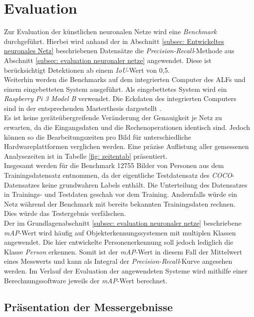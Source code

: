 \chapter{Evaluation}
\label{ch: Verifikation}
Zur Evaluation der künstlichen neuronalen Netze wird eine \textit{Benchmark} durchgeführt. Hierbei wird anhand der in Abschnitt \ref{subsec: Entwickeltes neuronales Netz} beschriebenen Datensätze die \textit{Precision-Recall}-Methode aus Abschnitt \ref{subsec: evaluation neuronaler netze} angewendet. Diese ist berücksichtigt Detektionen ab einem \textit{IoU}-Wert von 0,5.\\

 Weiterhin werden die Benchmarks auf dem integrierten Computer des ALFs und einem eingebetteten System ausgeführt. Als eingebettetes System wird ein \textit{Raspberry Pi 3 Model B} verwendet. Die Eckdaten des integrierten Computers sind in der entsprechenden Masterthesis dargestellt \cite{alf}.\\

Es ist keine geräteübergreifende Veränderung der Genauigkeit je Netz zu erwarten, da die Eingangsdaten und die Rechenoperationen identisch sind. Jedoch können so die Bearbeitungszeiten pro Bild für unterschiedliche Hardwareplattformen verglichen werden. Eine präzise Auflistung aller gemessenen Analysezeiten ist in Tabelle \ref{fig: zeitentab} präsentiert. \\

Insgesamt werden für die Benchmark 12755 Bilder von Personen aus dem Trainingsdatensatz entnommen, da der eigentliche Testdatensatz des \textit{COCO}-Datensatzes keine grundwahren Labels enthält. Die Unterteilung des Datensatzes in Trainings- und Testdaten geschah vor dem Training. Andernfalls würde ein Netz während der Benchmark mit bereits bekannten Trainingsdaten rechnen. Dies würde das Testergebnis verfälschen. \\
 

Der im Grundlagenabschnitt \ref{subsec: evaluation neuronaler netze} beschriebene \textit{mAP}-Wert wird häufig auf Objekterkennungssystemen mit multiplen Klassen angewendet. Die hier entwickelte Personenerkennung soll jedoch lediglich die Klasse \textit{Person} erkennen. Somit ist der \textit{mAP}-Wert in diesem Fall der Mittelwert eines Messwerts und kann als Integral der \textit{Precision-Recall}-Kurve angesehen werden. Im Verlauf der Evaluation der angewendeten Systeme wird mithilfe einer Berechnungssoftware jeweils der \textit{mAP}-Wert berechnet.
 
\section{Präsentation der Messergebnisse} 

